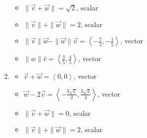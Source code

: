 \begin{enumerate}
\begin{multicols}{2}
\begin{itemize}
\end{itemize}

\end{multicols}

\begin{multicols}{2}

\begin{itemize}

\item $\| \vec{v} + \vec{w} \| = \sqrt{2}$, scalar
\item  $\| \vec{v} \| + \| \vec{w}\| = 2$, scalar

\end{itemize}

\end{multicols}

\begin{multicols}{2}

\begin{itemize}

\item $\| \vec{v} \| \vec{w} - \| \vec{w} \| \vec{v}  = \left<-\frac{7}{5},-\frac{1}{5}\right>$, vector
\item $\|w\| \hat{v}= \left<\frac{3}{5}, \frac{4}{5} \right>$, vector

\end{itemize}

\end{multicols}

\item  

\begin{multicols}{2}

\begin{itemize}

\item  $\vec{v} + \vec{w} = \left<0,0\right> $, vector
\item  $\vec{w}  - 2\vec{v}  = \left<-\frac{3\sqrt{2}}{2}, \frac{3\sqrt{2}}{2} \right>$, vector

\end{itemize}

\end{multicols}

\begin{multicols}{2}

\begin{itemize}

\item $\| \vec{v} + \vec{w} \| = 0$, scalar
\item  $\| \vec{v} \| + \| \vec{w}\| = 2$, scalar


\end{itemize}
\end{multicols}
\end{enumerate}
